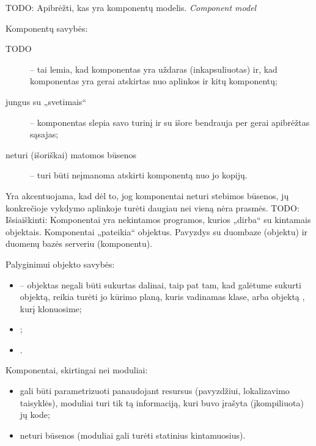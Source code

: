 TODO: Apibrėžti, kas yra komponentų modelis. \emph{Component model}

Komponentų savybės\cite[36]{cs-beyond-object-oriented-programming}:
\begin{description}
  \item[TODO] 
    – tai lemia, kad komponentas yra uždaras (inkapsuliuotas) ir, kad
    komponentas yra gerai atskirtas nuo aplinkos ir kitų komponentų;
  \item[jungus su „svetimais“] 
    – komponentas slepia savo turinį ir su išore bendrauja per gerai
    apibrėžtas sąsajas;
  \item[neturi (išoriškai) matomos būsenos]  – turi būti neįmanoma atskirti komponentą
    nuo jo kopijų.
\end{description}
Yra akcentuojama, kad dėl to, jog komponentai neturi stebimos būsenos,
jų konkrečioje vykdymo aplinkoje turėti daugiau nei vieną nėra prasmės.
TODO: Išsiaiškinti\cite[37]{cs-beyond-object-oriented-programming}:
Komponentai yra nekintamos programos, kurios „dirba“ su kintamais
objektais. Komponentai „pateikia“ objektus. 
Pavyzdys su duombaze (objektu) ir duomenų bazės serveriu (komponentu).

Palyginimui objekto savybės\cite[36]{cs-beyond-object-oriented-programming}:
\begin{itemize}
  \item {}
    – objektas negali būti sukurtas dalinai, taip pat tam, kad galėtume
    sukurti objektą, reikia turėti jo kūrimo planą, kuris vadinamas klase,
    arba objektą , kurį klonuosime;
  \item {};
  \item {}.
\end{itemize}

Komponentai, skirtingai nei
moduliai\cite[39-40]{cs-beyond-object-oriented-programming}:
\begin{itemize}
  \item gali būti parametrizuoti panaudojant resursus (pavyzdžiui,
    lokalizavimo taisyklės), moduliai turi tik tą informaciją, kuri
    buvo įrašyta (įkompiliuota) jų kode;
  \item neturi būsenos (moduliai gali turėti statinius kintamuosius).
\end{itemize}

